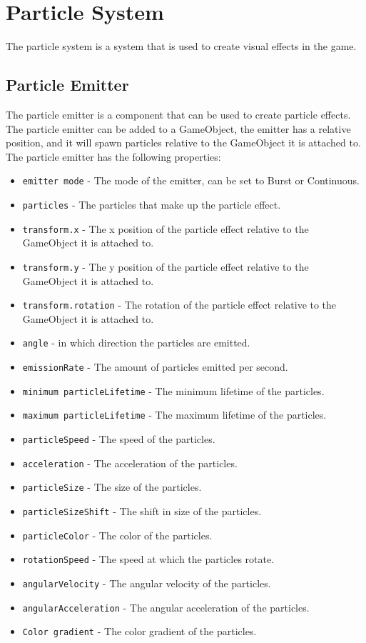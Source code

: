 \section{Particle System}
\label{sec:particlesystem}
The particle system is a system that is used to create visual effects in the game.
\subsection{Particle Emitter}
The particle emitter is a component that can be used to create particle effects.
The particle emitter can be added to a GameObject, the emitter has a relative position, and it will spawn particles relative to the GameObject it is attached to.
The particle emitter has the following properties:
\begin{itemize}
    \item \texttt{emitter mode} - The mode of the emitter, can be set to Burst or Continuous.
    \item \texttt{particles} - The particles that make up the particle effect.
    \item \texttt{transform.x} - The x position of the particle effect relative to the GameObject it is attached to.
    \item \texttt{transform.y} - The y position of the particle effect relative to the GameObject it is attached to.
    \item \texttt{transform.rotation} - The rotation of the particle effect relative to the GameObject it is attached to.
    \item \texttt{angle} - in which direction the particles are emitted.
    \item \texttt{emissionRate} - The amount of particles emitted per second.
    \item \texttt{minimum particleLifetime} - The minimum lifetime of the particles.
    \item \texttt{maximum particleLifetime} - The maximum lifetime of the particles.
    \item \texttt{particleSpeed} - The speed of the particles.
    \item \texttt{acceleration} - The acceleration of the particles.
    \item \texttt{particleSize} - The size of the particles.
    \item \texttt{particleSizeShift} - The shift in size of the particles.
    \item \texttt{particleColor} - The color of the particles.
    \item \texttt{rotationSpeed} - The speed at which the particles rotate.
    \item \texttt{angularVelocity} - The angular velocity of the particles.
    \item \texttt{angularAcceleration} - The angular acceleration of the particles.
    \item \texttt{Color gradient} - The color gradient of the particles.
\end{itemize}


